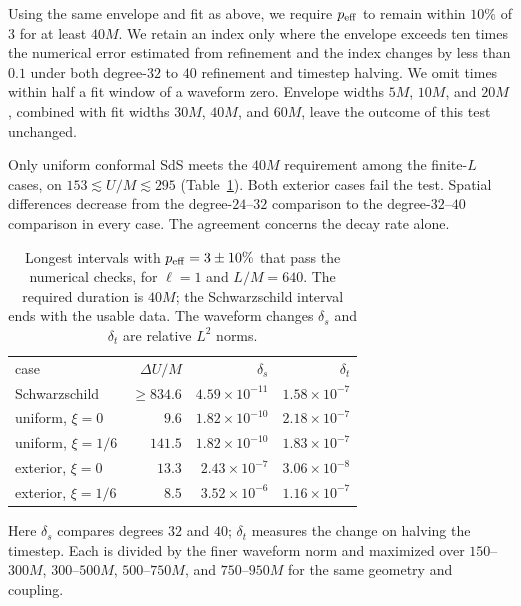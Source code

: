 \documentclass[
 aps,
 prd,
 reprint,
 superscriptaddress,
 nofootinbib,
 longbibliography
]{revtex4-2}
\begin{document}
Using the same envelope and fit as above, we require $p_{\rm eff}$ to
remain within $10\%$ of $3$ for at least $40M$.  We retain an index only
where the envelope exceeds ten times the numerical error estimated from
refinement and the index changes by less than $0.1$ under both degree-$32$
to $40$ refinement and timestep halving.  We omit times within half a fit
window of a waveform zero.  Envelope widths $5M$, $10M$, and $20M$, combined
with fit widths $30M$, $40M$, and $60M$, leave the outcome of this test
unchanged.

Only uniform conformal SdS meets the $40M$ requirement among the finite-$L$
cases, on $153\lesssim U/M\lesssim295$
(Table~\ref{tab:matched-tail-intervals}).  Both exterior cases fail the test.
Spatial differences decrease from the degree-$24$--$32$ comparison to the
degree-$32$--$40$ comparison in every case.  The agreement concerns the
decay rate alone.

\begin{table}[t]
 \caption{Longest intervals with $p_{\rm eff}=3\pm10\%$ that pass the
 numerical checks, for $\ell=1$ and $L/M=640$.  The required duration is
 $40M$; the Schwarzschild interval ends with the usable data.  The waveform
 changes $\delta_s$ and $\delta_t$ are relative $L^2$ norms.}
 \label{tab:matched-tail-intervals}
 \setlength{\tabcolsep}{4pt}
 \begin{ruledtabular}
 \begin{tabular}{lrrr}
 case & $\Delta U/M$ & $\delta_s$ & $\delta_t$\\
 \colrule
 Schwarzschild & $\geq834.6$ & $4.59\times10^{-11}$ & $1.58\times10^{-7}$\\
 uniform, $\xi=0$ & $9.6$ & $1.82\times10^{-10}$ & $2.18\times10^{-7}$\\
 uniform, $\xi=1/6$ & $141.5$ & $1.82\times10^{-10}$ & $1.83\times10^{-7}$\\
 exterior, $\xi=0$ & $13.3$ & $2.43\times10^{-7}$ & $3.06\times10^{-8}$\\
 exterior, $\xi=1/6$ & $8.5$ & $3.52\times10^{-6}$ & $1.16\times10^{-7}$\\
 \end{tabular}
 \end{ruledtabular}
\end{table}

Here $\delta_s$ compares degrees $32$ and $40$; $\delta_t$ measures the
change on halving the timestep.  Each is divided by the finer waveform norm
and maximized over $150$--$300M$, $300$--$500M$, $500$--$750M$, and
$750$--$950M$ for the same geometry and coupling.
\end{document}
